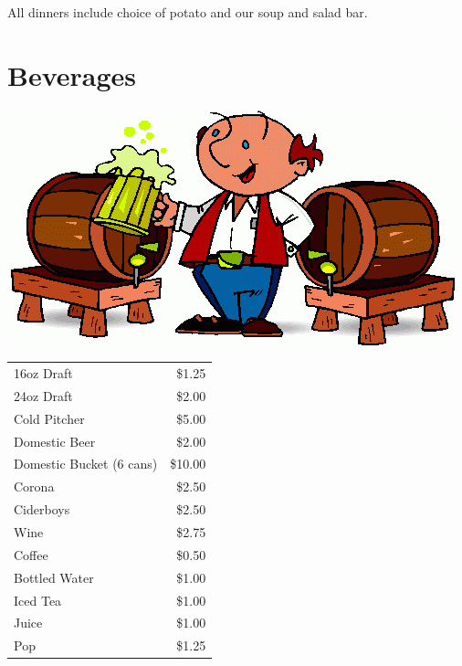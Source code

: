 \documentclass[a0,landscape]{a0poster}
\begin{document}
\begin{multicols}{4}
\vspace{.5cm}

All dinners include choice of potato and our soup and salad bar.


\color{DarkSlateGray} %

\section*{Beverages}
\begin{center}

\includegraphics[width=0.8\linewidth]{images/beer_kegs}
\end{center}

\begin{center}
\begin{tabular}{ l r }
16oz Draft & \$1.25 \\
24oz Draft & \$2.00 \\
Cold Pitcher & \$5.00 \\
Domestic Beer & \$2.00 \\
Domestic Bucket (6 cans) & \$10.00 \\
Corona & \$2.50 \\
Ciderboys & \$2.50 \\
Wine & \$2.75 \\
Coffee & \$0.50 \\
Bottled Water & \$1.00 \\
Iced Tea & \$1.00 \\
Juice & \$1.00 \\
Pop & \$1.25 \\
\end{tabular}
\end{center}


\end{multicols}
\end{document}
